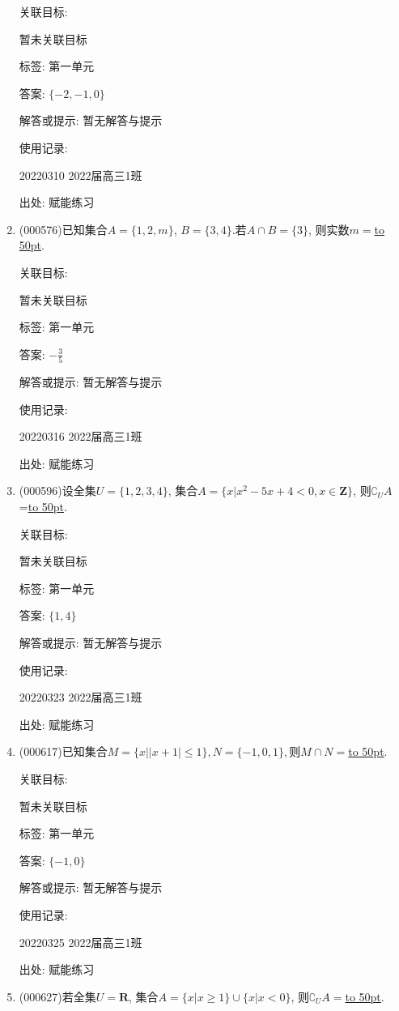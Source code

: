 \documentclass[10pt,a4paper]{article}
\newcommand{\blank}[1]{\underline{\hbox to #1pt{}}}
\begin{document}
\begin{enumerate}[1.]
关联目标:

暂未关联目标



标签: 第一单元

答案: $\{-2,-1,0\}$

解答或提示: 暂无解答与提示

使用记录:

20220310	2022届高三1班	


出处: 赋能练习
\item { (000576)}已知集合$A=\{1,2,m\}$, $B=\{3,4\}$.若$A\cap B=\{3\}$, 则实数$m=$\blank{50}.


关联目标:

暂未关联目标



标签: 第一单元

答案: $-\frac 35$

解答或提示: 暂无解答与提示

使用记录:

20220316	2022届高三1班	


出处: 赋能练习
\item { (000596)}设全集$U=\{1,2,3,4\}$, 集合$A=\{x|x^2-5x+4<0,x\in \mathbf{Z}\}$, 则$\complement_U A$=\blank{50}.


关联目标:

暂未关联目标



标签: 第一单元

答案: $\{1,4\}$

解答或提示: 暂无解答与提示

使用记录:

20220323	2022届高三1班	


出处: 赋能练习
\item { (000617)}已知集合$M=\{x||x+1|\le 1\},N=\{-1,0,1\},$则$M\cap N=$\blank{50}.


关联目标:

暂未关联目标



标签: 第一单元

答案: $\{-1,0\}$

解答或提示: 暂无解答与提示

使用记录:

20220325	2022届高三1班	


出处: 赋能练习
\item { (000627)}若全集$U=\mathbf{R}$, 集合$A=\{x|x\ge 1\}\cup\{x|x<0\}$, 则$\complement_U A=$\blank{50}.



\end{enumerate}
\end{document}
